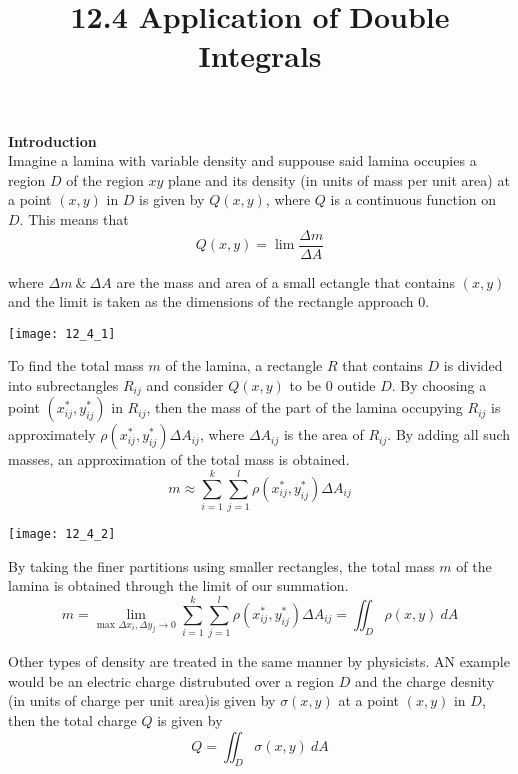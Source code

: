 \documentclass{article}
\title{12.4 Application of Double Integrals}
\begin{document}
    \maketitle

    \textbf{Introduction}\\
    Imagine a lamina with variable density and suppouse said lamina occupies a region $ D $ of the region $ xy $ plane and its density (in units of mass per unit area) at a point $ (x,y) $ in $ D $ is given by $ Q(x,y) $, where $ Q $ is a continuous function on $ D $. This means that
    \[
        Q(x,y) = \lim \frac{\Delta m}{\Delta A} 
    \]

    where $ \Delta m ~\&~ \Delta A $ are the mass and area of a small ectangle that contains $ (x,y) $ and the limit is taken as the dimensions of the rectangle approach $ 0 $.
    
    \begin{center}
        \texttt{[image: 12\_4\_1]}
    \end{center}

    To find the total mass $ m $ of the lamina, a rectangle $ R $ that contains $ D $ is divided into subrectangles $ R_{ij}  $ and consider $ Q(x,y) $ to be $ 0 $ outide $ D $. By choosing a point $ (x^{*}_{ij},y^{*}_{ij}) $ in $ R_{ij} $, then the mass of the part of the lamina occupying $ R_{ij} $ is approximately $ \rho(x^{*}_{ij},y^{*}_{ij}) \Delta A_{ij} $, where $ \Delta A_{ij} $ is the area of $ R_{ij} $. By adding all such masses, an approximation of the total mass is obtained.
    \[
      m \approx \sum^{k}_{i=1} \sum^{l}_{j=1} \rho(x^{*}_{ij},y^{*}_{ij}) \Delta A_{ij}  
    \]

    \begin{center}
        \texttt{[image: 12\_4\_2]}
    \end{center}

    By taking the finer partitions using smaller rectangles, the total mass $ m $ of the lamina is obtained through the limit of our summation.
    \[
      m = \lim_{\text{max } \Delta x_{i} , \Delta y_{j} \to 0}{\sum^{k}_{i=1} \sum^{l}_{j=1} \rho(x^{*}_{ij},y^{*}_{ij}) \Delta A_{ij} } = \iint_{D} \rho(x,y) ~dA 
    \]
    
   Other types of density are treated in the same manner by physicists. AN example would be an electric charge distrubuted over a region $ D $ and the charge desnity (in units of charge per unit area)is given by $ \sigma(x,y) $ at a point $ (x,y) $ in $ D $, then the total charge $ Q $ is given by
   \[
       Q = \iint_D \sigma(x,y)~dA
   \]
\end{document}
